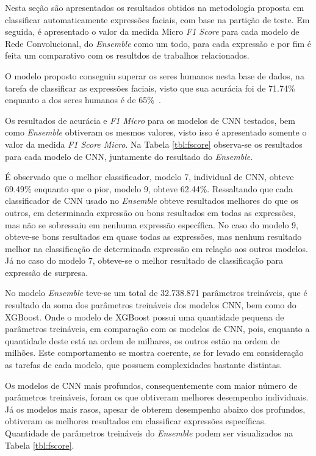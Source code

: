 Nesta seção são apresentados os resultados obtidos na metodologia proposta em classificar automaticamente expressões faciais, com base na partição de teste. Em seguida, é apresentado o valor da medida Micro \textit{F1 Score} para cada modelo de Rede Convolucional, do \textit{Ensemble} como um todo, para cada expressão e por fim  é feita um comparativo com os resultdos de trabalhos relacionados. 

O modelo proposto conseguiu superar os seres humanos nesta base de dados, na tarefa de classificar as expressões faciais, visto que sua acurácia foi de 71.74\%\, enquanto a dos seres humanos é de 65\%\ \cite{goodfellow2013challenges}.

Os resultados de acurácia e \emph{F1 Micro} para os modelos de CNN testados, bem como \emph{Ensemble} obtiveram os mesmos valores, visto isso é apresentado somente o valor da medida \emph{F1 Score Micro}. Na Tabela \ref{tbl:fscore} observa-se os resultados para cada modelo de CNN, juntamente do resultado do \emph{Ensemble}.



É observado que o melhor classificador, modelo 7, individual de CNN, obteve 69.49\% enquanto que o pior, modelo 9, obteve 62.44\%. Ressaltando que cada classificador de CNN usado no \emph{Ensemble} obteve resultados melhores do que os outros, em determinada expressão ou bons resultados em todas as expressões, mas não se sobressaiu em nenhuma expressão específica. No caso do modelo 9, obteve-se bons resultados em quase todas as expressões, mas nenhum resultado melhor na classificação de determinada expressão em relação aos outros modelos. Já no caso do modelo 7, obteve-se o melhor resultado de classificação para expressão de surpresa.

No modelo \textit{Ensemble} teve-se um total de 32.738.871 parâmetros treináveis, que é resultado da soma dos parâmetros treináveis dos modelos CNN, bem como do XGBoost. Onde o modelo de XGBoost possui uma quantidade pequena de parâmetros treináveis, em comparação com os modelos de CNN, pois, enquanto a quantidade deste está na ordem de milhares, os outros estão na ordem de milhões. Este comportamento se mostra coerente, se for levado em consideração as tarefas de cada modelo, que possuem complexidades bastante distintas.

Os modelos de CNN mais profundos, consequentemente com maior número de parâmetros treináveis, foram os que obtiveram melhores desempenho individuais. Já os modelos mais rasos, apesar de obterem desempenho abaixo dos profundos, obtiveram os melhores resultados em classificar expressões específicas. Quantidade de parâmetros treináveis do \textit{Ensemble} podem ser visualizados na Tabela \ref{tbl:fscore}.

